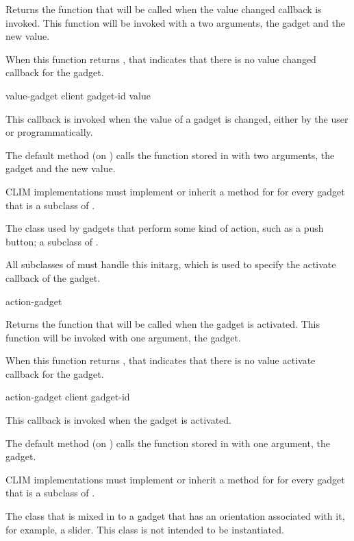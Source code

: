 Returns the function that will be called when the value changed callback is
invoked.  This function will be invoked with a two arguments, the gadget and
the new value.

When this function returns , that indicates that there is no value
changed callback for the gadget.

 {value-gadget client gadget-id value}

This callback is invoked when the value of a gadget is changed, either by the
user or programmatically.

The default method (on ) calls the function stored in
 with two arguments, the gadget and the new
value.

CLIM implementations must implement or inherit a method for
 for every gadget that is a subclass of
.



The class used by gadgets that perform some kind of action, such as a push
button; a subclass of .
\AbstractClass


All subclasses of  must handle this initarg, which is used to
specify the activate callback of the gadget.

 {action-gadget}

Returns the function that will be called when the gadget is activated.  This
function will be invoked with one argument, the gadget.

When this function returns , that indicates that there is no value
activate callback for the gadget.

 {action-gadget client gadget-id}

This callback is invoked when the gadget is activated.

The default method (on ) calls the function stored in
 with one argument, the gadget.

CLIM implementations must implement or inherit a method for
 for every gadget that is a subclass of
.



The class that is mixed in to a gadget that has an orientation associated with
it, for example, a slider.  This class is not intended to be instantiated.


